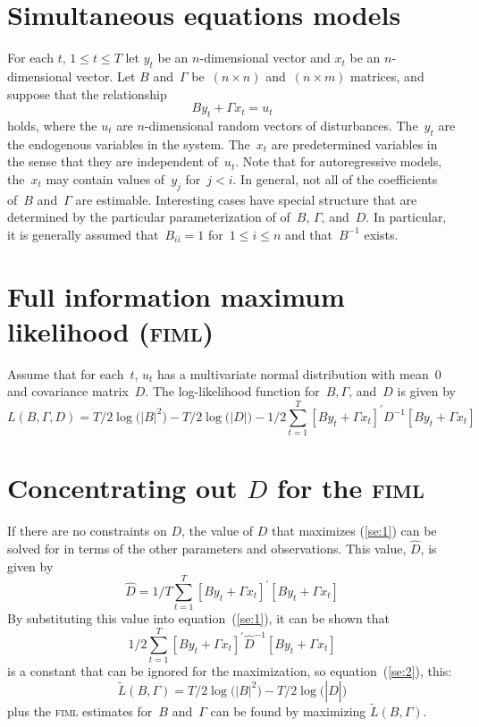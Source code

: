 %
%

\section{Simultaneous equations models}

For each $t$, $1\le t\le T$ let $y_t$ be an $n$-dimensional vector
and $x_t$ be an $n$-dimensional vector. Let $B$ and~$\Gamma$ 
be~$(n \times n)$  and~$(n \times m)$ matrices, and suppose that the relationship
$$By_t + \Gamma x_t=u_t$$
holds, where the $u_t$ are $n$-dimensional random vectors of disturbances.
The~$y_t$ are the endogenous variables in the system. The~$x_t$ are
predetermined variables in the sense that they are independent of~$u_t$.
Note that for autoregressive models, the~$x_t$ may contain values 
of~$y_j$ for~$j<i$. In general, not all of the coefficients of~$B$ 
and~$\Gamma$ are estimable. Interesting cases have special structure that
are determined by the particular parameterization of
of~$B$, $\Gamma$, and~$D$. In particular, it is generally assumed 
that~$B_{ii}=1$ for~$1 \le i \le n$ and that~$B^{-1}$ exists.


\section{Full information maximum likelihood (\textsc{fiml})} 

Assume that for each~$t$, $u_t$ has a multivariate normal distribution
with mean~$0$ and covariance matrix~$D$.
The log-likelihood function for~$B,\Gamma$, and~$D$ is given
by
\begin{equation}
  L(B,\Gamma,D)=T/2\log\big(|B|^2\big)-T/2\log\big(|D|\big)-1/2\sum_{t=1}^T
  [By_t + \Gamma x_t]^\prime D^{-1} [By_t + \Gamma x_t] \label{se:1}
\end{equation}


\section{Concentrating out $D$ for the \textsc{fiml}}

If there are no constraints on $D$, the value of $D$ that maximizes
(\ref{se:1}) can be solved for in terms of the other parameters and
observations. This value, $\hat D$, is given by
\begin{equation}
  \hat D =
  1/T\sum_{t=1}^T [By_t + \Gamma x_t]^\prime [By_t + \Gamma x_t] \label{se:2}
\end{equation}
By
substituting this value into equation~(\ref{se:1}), %
it can be shown that
$$1/2\sum_{t=1}^T 
  [By_t + \Gamma x_t]^\prime \hat D^{-1} [By_t + \Gamma x_t] $$
is a constant that can be ignored for the maximization, so equation~(\ref{se:2}), this: 
\begin{equation}
  \tilde L(B,\Gamma)=T/2\log \big(|B|^2 \big)-T/2\log \big(|\hat D| \big)\label{se:3} 
\end{equation}
plus the \textsc{fiml} estimates for~$B$ and~$\Gamma$ can be found by maximizing
$\tilde L(B,\Gamma)$.

